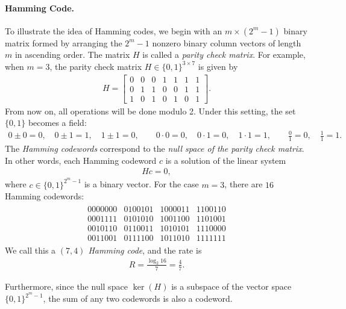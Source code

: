 \documentclass{article}
\numberwithin{equation}{section}
\theoremstyle{plain}
\theoremstyle{definition}
\begin{document}
\paragraph{Hamming Code.} To illustrate the idea of Hamming codes, we begin with an $m\times(2^m-1)$ binary matrix formed by arranging the $2^m-1$ nonzero binary column vectors of length $m$ in ascending order. The matrix $H$ is called a \textit{parity check matrix}. For example, when $m=3$, the parity check matrix $H\in\{0,1\}^{3\times 7}$ is given by
\begin{align*}
	H=\begin{bmatrix}
		0 & 0 & 0 & 1 & 1 & 1 & 1\\
		0 & 1 & 1 & 0 & 0 & 1 & 1\\
		1 & 0 & 1 & 0 & 1 & 0 & 1
	\end{bmatrix}.
\end{align*}
From now on, all operations will be done modulo 2. Under this setting, the set $\{0,1\}$ becomes a field:
\begin{align*}
	0\pm 0=0,\quad 0\pm 1=1,\quad 1\pm 1=0,\qquad 0\cdot 0=0,\quad 0\cdot 1=0,\quad 1\cdot 1=1,\qquad\frac{0}{1}=0,\quad\frac{1}{1}=1.
\end{align*}  
The \textit{Hamming codewords} correspond to the \textit{null space of the parity check matrix}. In other words, each Hamming codeword $c$ is a solution of the linear system
\begin{align*}
	Hc=0,
\end{align*}
where $c\in\{0,1\}^{2^m-1}$ is a binary vector. For the case $m=3$, there are $16$ Hamming codewords:
\begin{align}
	\begin{matrix}
		0000000 & 0100101 & 1000011 & 1100110\\
		0001111 & 0101010 & 1001100 & 1101001\\
		0010110 & 0110011 & 1010101 & 1110000\\
		0011001 & 0111100 & 1011010 & 1111111
	\end{matrix}\label{hammingcode74}
\end{align}
We call this a \textit{$(7,4)$ Hamming code}, and the rate is
\begin{align*}
	R=\frac{\log_2 16}{7}=\frac{4}{7}.
\end{align*}

Furthermore, since the null space $\ker(H)$ is a subspace of the vector space $\{0,1\}^{2^m-1}$, the sum of any two codewords is also a codeword.
\end{document}
